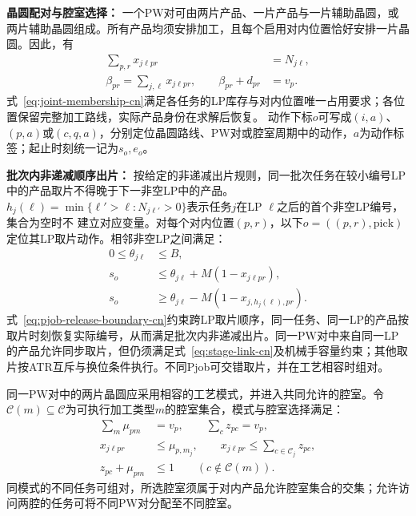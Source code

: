 \noindent\textbf{晶圆配对与腔室选择：}
一个PW对可由两片产品、一片产品与一片辅助晶圆，或两片辅助晶圆组成。所有产品均须安排加工，且每个启用对内位置恰好安排一片晶圆。因此，有
\begin{equation}
\begin{aligned}
\sum_{p,r}x_{j\ell pr}&=N_{j\ell},\\
\beta_{pr}=\sum_{j,\ell}x_{j\ell pr},\qquad
\beta_{pr}+d_{pr}&=v_p.
\end{aligned}
\label{eq:joint-membership-cn}
\end{equation}
式~\eqref{eq:joint-membership-cn}满足各任务的LP库存与对内位置唯一占用要求；各位置保留完整加工路线，实际产品身份在求解后恢复。
动作下标$o$可写成$(i,a)$、$(p,a)$或$(c,q,a)$，分别定位晶圆路线、PW对或腔室周期中的动作，$a$为动作标签；起止时刻统一记为$s_o,e_o$。

\noindent\textbf{批次内非递减顺序出片：}
按给定的非递减出片规则，同一批次任务在较小编号LP中的产品取片不得晚于下一非空LP中的产品。
$h_j(\ell)=\min\{\ell'>\ell:N_{j\ell'}>0\}$表示任务$j$在LP $\ell$之后的首个非空LP编号，集合为空时不
建立对应变量。对每个对内位置$(p,r)$，以下$o=((p,r),\mathrm{pick})$定位其LP取片动作。相邻非空LP之间满足：
\begin{equation}
\begin{aligned}
0\le\theta_{j\ell}&\le B,\\
s_o&\le\theta_{j\ell}+M(1-x_{j\ell pr}),\\
s_o&\ge\theta_{j\ell}-M(1-x_{j,h_j(\ell),pr}).
\end{aligned}
\label{eq:pjob-release-boundary-cn}
\end{equation}
式~\eqref{eq:pjob-release-boundary-cn}约束跨LP取片顺序，同一任务、同一LP的产品按取片时刻恢复实际编号，从而满足批次内非递减出片。同一PW对中来自同一LP的产品允许同步取片，但仍须满足式~\eqref{eq:stage-link-cn}及机械手容量约束；其他取片按ATR互斥与换位条件执行。不同Pjob可交错取片，并在工艺相容时组对。

同一PW对中的两片晶圆应采用相容的工艺模式，并进入共同允许的腔室。令$\mathcal C(m)\subseteq\mathcal C$为可执行加工类型$m$的腔室集合，模式与腔室选择满足：
\begin{equation}
\begin{aligned}
\sum_m\mu_{pm}&=v_p,\qquad \sum_c z_{pc}=v_p,\\
x_{j\ell pr}&\le\mu_{p,m_j},\qquad
x_{j\ell pr}\le\sum_{c\in\mathcal C_j}z_{pc},\\
z_{pc}+\mu_{pm}&\le1\qquad(c\notin\mathcal C(m)).
\end{aligned}
\label{eq:joint-chamber-cn}
\end{equation}
同模式的不同任务可组对，所选腔室须属于对内产品允许腔室集合的交集；允许访问两腔的任务可将不同PW对分配至不同腔室。

